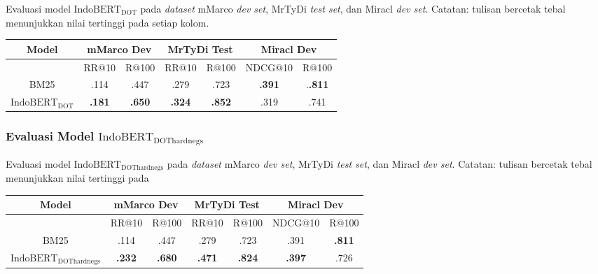 \documentclass[10pt]{beamer}
\newcommand{\f}[1]{\textit{#1}}
\newcommand{\bo}[1]{\textbf{#1}}
\begin{document}
\begin{frame}
    Evaluasi model $\text{IndoBERT}_{\text{DOT}}$ pada \f{dataset} mMarco \f{dev set}, MrTyDi \f{test set}, dan Miracl \f{dev set}. Catatan: tulisan bercetak tebal menunjukkan nilai tertinggi pada setiap kolom.
    \begin{table}[!ht]
    \centering
    \footnotesize
    \begin{tabular}
        {|c|c|c|c|c|c|c|} \hline
        Model                             & \multicolumn{2}{c|}{mMarco Dev} &
        \multicolumn{2}{c|}{MrTyDi Test} & \multicolumn{2}{c|}{Miracl Dev}                                             \\ \hline
                                          & RR@10 & R@100 & RR@10 & R@100 & NDCG@10 & R@100 \\ \hline
        BM25                              & .114  & .447   & .279   & .723   & \bo{.391}    & .\bo{.811} \\ \hline
        $\text{IndoBERT}_{\text{DOT}}$    & \bo{.181}  & \bo{.650}   & \bo{.324}   & \bo{.852}   & .319    & .741 \\ \hline
        
    \end{tabular}
\end{table}
\end{frame}

\begin{frame}
    \frametitle{Evaluasi Model $\text{IndoBERT}_{\text{DOThardnegs}}$}
    Evaluasi model $\text{IndoBERT}_{\text{DOThardnegs}}$ pada \f{dataset} mMarco \f{dev set}, MrTyDi \f{test set}, dan Miracl \f{dev set}. Catatan: tulisan bercetak tebal menunjukkan nilai tertinggi pada 
    \begin{table}[!ht]
        \centering
        \footnotesize
        \begin{tabular}{|c|c|c|c|c|c|c|} \hline
            Model                                     & \multicolumn{2}{c|}{mMarco Dev} &
            \multicolumn{2}{c|}{MrTyDi Test}          & \multicolumn{2}{c|}{Miracl Dev}                                             \\ \hline
                                                      & RR@10 & R@100 & RR@10 & R@100 & NDCG@10 & R@100 \\ \hline
                    BM25                              & .114  & .447   & .279   & .723   & .391    & \bo{.811} \\ \hline
            $\text{IndoBERT}_{\text{DOThardnegs}}$    & \bo{.232}  & \bo{.680}   & \bo{.471}   & \bo{.824}   & \bo{.397}    & .726 \\ \hline
        \end{tabular}
    \end{table}    
\end{frame}
\end{document}
